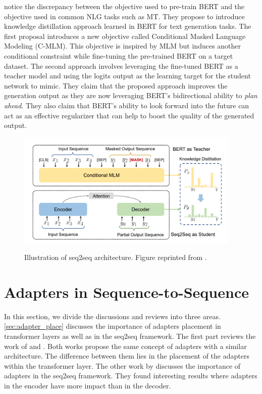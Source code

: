  notice the discrepancy between the objective used to pre-train BERT and the objective used in common NLG tasks such as MT. They propose to introduce knowledge distillation approach learned in BERT for text generation tasks. The first proposal introduces a new objective called Conditional Masked Language Modeling (C-MLM). This objective is inspired by MLM but induces another conditional constraint while fine-tuning the pre-trained BERT on a target dataset. The second approach involves leveraging the fine-tuned BERT as a teacher model and using the logits output as the learning target for the student network to mimic. They claim that the proposed approach improves the generation output as they are now leveraging BERT's bidirectional ability to \textit{plan ahead}. They also claim that BERT's ability to look forward into the future can act as an effective regularizer that can help to boost the quality of the generated output.

\begin{figure}[h]
    {\includegraphics[width=0.95\textwidth]{img/bert_distill.png}}
    \centering
    \caption{Illustration of seq2seq architecture. Figure reprinted from .}
    \label{img:bert_distill}
\end{figure}

\section{Adapters in Sequence-to-Sequence}
\label{sec:adapter_seq}

In this section, we divide the discussions and reviews into three areas. \cref{sec:adapter_place} discusses the importance of adapters placement in transformer layers as well as in the seq2seq framework. The first part reviews the work of  and . Both works propose the same concept of adapters with a similar architecture. The difference between them lies in the placement of the adapters within the transformer layer. The other work by  discusses the importance of adapters in the seq2seq framework. They found interesting results where adapters in the encoder have more impact than in the decoder.

